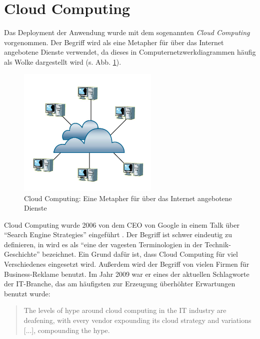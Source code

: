 \section{Cloud Computing}
\label{sec:cloud}

Das Deployment der Anwendung wurde mit dem sogenannten \textit{Cloud Computing} vorgenommen. Der Begriff wird als eine Metapher für über das Internet angebotene Dienste verwendet, da dieses in Computernetzwerkdiagrammen häufig als Wolke dargestellt wird (s. Abb. \ref{fig:cloud-computing}).

\medskip
\begin{figure}[ht] 
  \begin{center}
    \includegraphics[width=0.6\textwidth]{grafik/cloud-computing} 
  \end{center}
  \caption{Cloud Computing: Eine Metapher für über das Internet angebotene Dienste \cite{cloud:graphic}}
  \label{fig:cloud-computing}
\end{figure}

Cloud Computing wurde 2006 von dem CEO von Google in einem Talk über \enquote{Search Engine Strategies} eingeführt \cite{cloud:transcript}. Der Begriff ist schwer eindeutig zu definieren, in  wird es als \enquote{eine der vagesten Terminologien in der Technik-Geschichte} bezeichnet. Ein Grund dafür ist, dass Cloud Computing für viel Verschiedenes eingesetzt wird. Außerdem wird der Begriff von vielen Firmen für Business-Reklame benutzt. Im Jahr 2009 war er eines der aktuellen Schlagworte der IT-Branche, das am häufigsten zur Erzeugung überhöhter Erwartungen benutzt wurde:

\begin{quote}
The levels of hype around cloud computing in the IT industry are deafening, with every vendor expounding its cloud strategy and variations [...], compounding the hype. \cite{cloud:hypecycle}
\end{quote}

